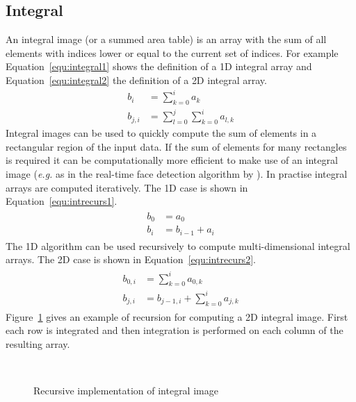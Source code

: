 \documentclass[12pt,a4paper,oneside,openright]{book}
\newcommand{\eg}{\emph{e.g.} }
\newcommand{\Eg}{For example }
\newcommand{\equ}[1]{Equation~\ref{equ:#1}}
\newcommand{\fig}[1]{Figure~\ref{fig:#1}}
\begin{document}
\begin{CJK}{UTF8}{}
\subsection{Integral}\label{cha:integral}
An integral image (or a summed area table) is an array with the sum of all elements with indices lower or equal to the current set of indices. \Eg \equ{integral1} shows the definition of a \ac{1D} integral array and \equ{integral2} the definition of a \ac{2D} integral array.
\begin{align}
  b_i&=\displaystyle\sum_{k=0}^ia_k\label{equ:integral1}\\
  b_{j,i}&=\displaystyle\sum_{l=0}^j\sum_{k=0}^ia_{l,k}\label{equ:integral2}
\end{align}
Integral images can be used to quickly compute the sum of elements in a rectangular region of the input data. If the sum of elements for many rectangles is required it can be computationally more efficient to make use of an integral image (\eg as in the real-time face detection algorithm by \citet{Viola01robustreal-time}). In practise integral arrays are computed iteratively. The \ac{1D} case is shown in \equ{intrecurs1}.
\begin{align}\label{equ:intrecurs1}
  \begin{split}
    b_0&=a_0\\
    b_i&=b_{i-1}+a_i
  \end{split}
\end{align}
The \ac{1D} algorithm can be used recursively to compute multi-dimensional integral arrays. The \ac{2D} case is shown in \equ{intrecurs2}.
\begin{align}\label{equ:intrecurs2}
  \begin{split}
    b_{0,i}&=\displaystyle\sum_{k=0}^ia_{0,k}\\
    b_{j,i}&=b_{j-1,i}+\displaystyle\sum_{k=0}^ia_{j,k}
  \end{split}
\end{align}
\fig{integrate} gives an example of recursion for computing a \ac{2D} integral image. First each row is integrated and then integration is performed on each column of the resulting array.
\begin{figure}[htbp]
   \begin{center}
     \\
     \caption{Recursive implementation of integral image\label{fig:integrate}}
   \end{center}
\end{figure}


\end{CJK}
\end{document}
